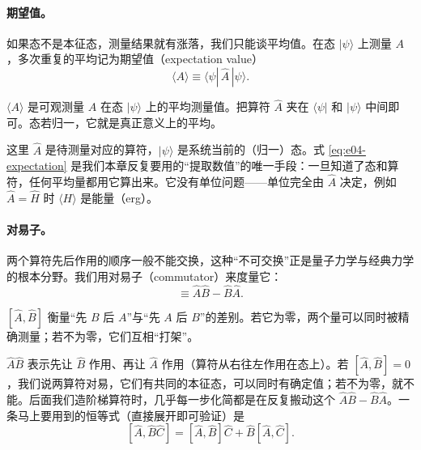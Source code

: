 \paragraph{期望值。}
如果态不是本征态，测量结果就有涨落，我们只能谈平均值。在态 \(|\psi\rangle\) 上测量 \(A\)，多次重复的平均记为期望值（expectation value）
\begin{equation}
  \langle A\rangle \equiv \langle\psi|\,\hat A\,|\psi\rangle .
  \label{eq:e04-expectation}
\end{equation}
\begin{formulaexplain}
\(\langle A\rangle\) 是可观测量 \(A\) 在态 \(|\psi\rangle\) 上的平均测量值。把算符 \(\hat A\) 夹在 \(\langle\psi|\) 和 \(|\psi\rangle\) 中间即可。态若归一，它就是真正意义上的平均。
\end{formulaexplain}
这里 \(\hat A\) 是待测量对应的算符，\(|\psi\rangle\) 是系统当前的（归一）态。式 \eqref{eq:e04-expectation} 是我们本章反复要用的“提取数值”的唯一手段：一旦知道了态和算符，任何平均量都用它算出来。它没有单位问题——单位完全由 \(\hat A\) 决定，例如 \(\hat A=\hat H\) 时 \(\langle H\rangle\) 是能量（erg）。

\paragraph{对易子。}
两个算符先后作用的顺序一般不能交换，这种“不可交换”正是量子力学与经典力学的根本分野。我们用对易子（commutator）来度量它：
\begin{equation}
  [\hat A,\hat B]\equiv \hat A\hat B-\hat B\hat A .
  \label{eq:e04-commutator}
\end{equation}
\begin{formulaexplain}
\([\hat A,\hat B]\) 衡量“先 \(B\) 后 \(A\)”与“先 \(A\) 后 \(B\)”的差别。若它为零，两个量可以同时被精确测量；若不为零，它们互相“打架”。
\end{formulaexplain}
\(\hat A\hat B\) 表示先让 \(\hat B\) 作用、再让 \(\hat A\) 作用（算符从右往左作用在态上）。若 \([\hat A,\hat B]=0\)，我们说两算符对易，它们有共同的本征态，可以同时有确定值；若不为零，就不能。后面我们造阶梯算符时，几乎每一步化简都是在反复搬动这个 \(\hat A\hat B-\hat B\hat A\)。一条马上要用到的恒等式（直接展开即可验证）是
\[
  [\hat A,\hat B\hat C]=[\hat A,\hat B]\hat C+\hat B[\hat A,\hat C].
\]

